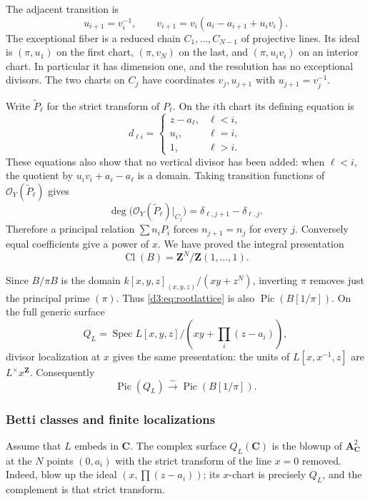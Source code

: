 \documentclass[11pt,a4paper]{amsart}
\numberwithin{equation}{section}
\theoremstyle{definition}
\theoremstyle{remark}
\newcommand{\Z}{\mathbf Z}
\newcommand{\C}{\mathbf C}
\newcommand{\A}{\mathbf A}
\newcommand{\OO}{\mathcal O}
\newcommand{\Spec}{\operatorname{Spec}}
\newcommand{\Pic}{\operatorname{Pic}}
\newcommand{\Cl}{\operatorname{Cl}}
\begin{document}
The adjacent transition is
\[
u_{i+1}=v_i^{-1},\qquad
v_{i+1}=v_i(a_i-a_{i+1}+u_i v_i).
\]
The exceptional fiber is a reduced chain $C_1,\ldots,C_{N-1}$ of projective lines. Its ideal is $(\pi,u_1)$ on the first chart, $(\pi,v_N)$ on the last, and $(\pi,u_i v_i)$ on an interior chart. In particular it has dimension one, and the resolution has no exceptional divisors. The two charts on $C_j$ have coordinates $v_j,u_{j+1}$ with $u_{j+1}=v_j^{-1}$.

Write $\widetilde P_\ell$ for the strict transform of $P_\ell$. On the $i$th chart its defining equation is
\[
d_{\ell i}=\begin{cases}
z-a_\ell,&\ell<i,\\
u_i,&\ell=i,\\
1,&\ell>i.
\end{cases}
\]
These equations also show that no vertical divisor has been added: when $\ell<i$, the quotient by $u_i v_i+a_i-a_\ell$ is a domain. Taking transition functions of $\OO_Y(\widetilde P_\ell)$ gives
\[
\deg\bigl(\OO_Y(\widetilde P_\ell)|_{C_j}\bigr)
=\delta_{\ell,j+1}-\delta_{\ell,j}.
\]
Therefore a principal relation $\sum n_iP_i$ forces $n_{j+1}=n_j$ for every $j$. Conversely equal coefficients give a power of $x$. We have proved the integral presentation
\begin{equation}\label{d3:eq:rootlattice}
\Cl(B)=\Z^N/\Z(1,\ldots,1).
\end{equation}

Since $B/\pi B$ is the domain $k[x,y,z]_{(x,y,z)}/(xy+z^N)$, inverting $\pi$ removes just the principal prime $(\pi)$. Thus \eqref{d3:eq:rootlattice} is also $\Pic(B[1/\pi])$. On the full generic surface
\[
Q_L=\Spec L[x,y,z]/\left(xy+\prod_i(z-a_i)\right),
\]
divisor localization at $x$ gives the same presentation: the units of $L[x,x^{-1},z]$ are $L^\times x^{\Z}$. Consequently
\begin{equation}\label{d3:eq:generalpiciso}
\Pic(Q_L)\xrightarrow{\sim}\Pic(B[1/\pi]).
\end{equation}

\subsubsection{Betti classes and finite localizations}

Assume that $L$ embeds in $\C$. The complex surface $Q_L(\C)$ is the blowup of $\A^2_{\C}$ at the $N$ points $(0,a_i)$ with the strict transform of the line $x=0$ removed. Indeed, blow up the ideal $(x,\prod(z-a_i))$; its $x$-chart is precisely $Q_L$, and the complement is that strict transform.
\end{document}
